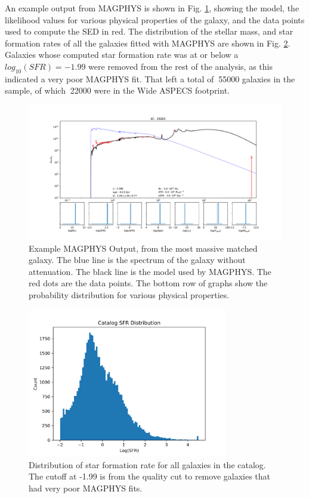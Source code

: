 An example output from MAGPHYS is shown in Fig. \ref{fig:MAGPHYS_Example}, showing the model, the likelihood values for various physical properties of the galaxy, and the data points used to compute the SED in red. The distribution of the stellar mass, and star formation rates of all the galaxies fitted with MAGPHYS are shown in Fig. \ref{fig:MAGPHYS_Properties}. Galaxies whose computed star formation rate was at or below a $log_{10}(SFR) = -1.99$ were removed from the rest of the analysis, as this indicated a very poor MAGPHYS fit. That left a total of $~$55000 galaxies in the sample, of which $~$22000 were in the Wide ASPECS footprint.

\begin{figure}[tbp]
\centering \includegraphics[width=120mm]{19265.pdf}
\caption{Example MAGPHYS Output, from the most massive matched galaxy. The blue line is the spectrum of the galaxy without attenuation. The black line is the model used by MAGPHYS. The red dots are the data points. The bottom row of graphs show the probability distribution for various physical properties.}
\label{fig:MAGPHYS_Example}
\end{figure}

\begin{figure}[!tbp]
\centering \includegraphics[width=87mm]{Survey/MAGPHYS_SFR.png}
\caption{Distribution of star formation rate for all galaxies in the catalog. The cutoff at -1.99 is from the quality cut to remove galaxies that had very poor MAGPHYS fits.}
\label{fig:MAGPHYS_Properties}
\end{figure}

